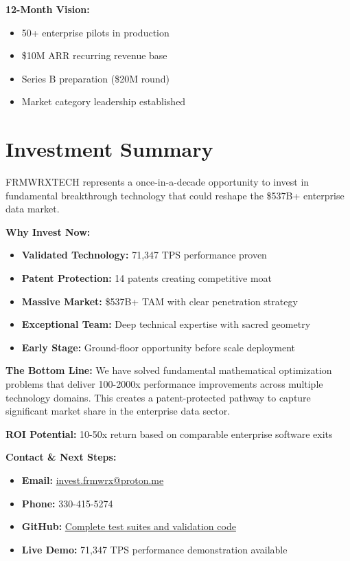 \documentclass{article}
\begin{document}
\textbf{12-Month Vision:}
\begin{itemize}
    \item 50+ enterprise pilots in production
    \item \$10M ARR recurring revenue base
    \item Series B preparation (\$20M round)
    \item Market category leadership established
\end{itemize}

\section{Investment Summary}
FRMWRXTECH represents a once-in-a-decade opportunity to invest in fundamental breakthrough technology that could reshape the \$537B+ enterprise data market.

\textbf{Why Invest Now:}
\begin{itemize}
    \item \textbf{Validated Technology:} 71,347 TPS performance proven
    \item \textbf{Patent Protection:} 14 patents creating competitive moat
    \item \textbf{Massive Market:} \$537B+ TAM with clear penetration strategy
    \item \textbf{Exceptional Team:} Deep technical expertise with sacred geometry
    \item \textbf{Early Stage:} Ground-floor opportunity before scale deployment
\end{itemize}

\textbf{The Bottom Line:} We have solved fundamental mathematical optimization problems that deliver 100-2000x performance improvements across multiple technology domains. This creates a patent-protected pathway to capture significant market share in the enterprise data sector.

\textbf{ROI Potential:} 10-50x return based on comparable enterprise software exits

\textbf{Contact \& Next Steps:}
\begin{itemize}
    \item \textbf{Email:} \href{mailto:invest.frmwrx@proton.me}{invest.frmwrx@proton.me}
    \item \textbf{Phone:} 330-415-5274
    \item \textbf{GitHub:} \href{https://4dllm.github.io/frmwrx-investor-portal}{Complete test suites and validation code}
    \item \textbf{Live Demo:} 71,347 TPS performance demonstration available
\end{itemize}
\end{document}
